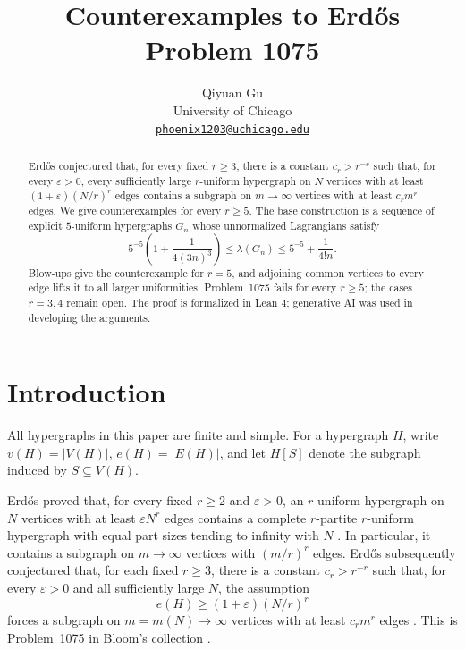\documentclass[11pt]{article}
\title{Counterexamples to Erd\H{o}s Problem 1075}
\author{Qiyuan Gu\\
University of Chicago\\
\href{mailto:phoenix1203@uchicago.edu}{\texttt{phoenix1203@uchicago.edu}}}
\date{}
\numberwithin{equation}{section}
\begin{document}
\maketitle

\begin{abstract}
Erd\H{o}s conjectured that, for every fixed \(r\ge3\), there is a constant
\(c_r>r^{-r}\) such that, for every \(\varepsilon>0\), every
sufficiently large \(r\)-uniform hypergraph on \(N\) vertices with
at least \((1+\varepsilon)(N/r)^r\) edges contains
a subgraph on \(m\to\infty\) vertices with at least \(c_rm^r\) edges.
We give counterexamples for every \(r\ge5\). The base construction is
a sequence of explicit \(5\)-uniform hypergraphs \(G_n\) whose
unnormalized Lagrangians satisfy
\[
 5^{-5}\left(1+\frac1{4(3n)^{3}}\right)
 \le\lambda(G_n)\le5^{-5}+\frac1{4!n}.
\]
Blow-ups give the counterexample for \(r=5\), and adjoining common
vertices to every edge lifts it to all larger uniformities.
Problem~1075 fails for every \(r\ge5\); the cases \(r=3,4\) remain open.
The proof is formalized in Lean 4; generative AI was used
in developing the arguments.
\end{abstract}

\section{Introduction}

All hypergraphs in this paper are finite and simple. For a hypergraph
\(H\), write \(v(H)=|V(H)|\), \(e(H)=|E(H)|\), and let \(H[S]\)
denote the subgraph induced by \(S\subseteq V(H)\).

Erd\H{o}s proved that, for every fixed \(r\ge2\) and \(\varepsilon>0\),
an \(r\)-uniform hypergraph on \(N\) vertices with at least
\(\varepsilon N^r\) edges contains a complete \(r\)-partite
\(r\)-uniform hypergraph with equal part sizes tending to infinity
with \(N\) \cite{Erdos64}. In particular, it contains a subgraph
on \(m\to\infty\) vertices with \((m/r)^r\) edges.
Erd\H{o}s subsequently conjectured that, for each fixed \(r\ge3\),
there is a constant \(c_r>r^{-r}\) such that, for every
\(\varepsilon>0\) and all sufficiently large \(N\), the assumption
\[
 e(H)\ge(1+\varepsilon)(N/r)^r
\]
forces a subgraph on \(m=m(N)\to\infty\) vertices with at least
\(c_rm^r\) edges \cite[p.~80]{Erdos74}.
This is Problem~1075 in Bloom's collection \cite{Bloom}.
\end{document}
